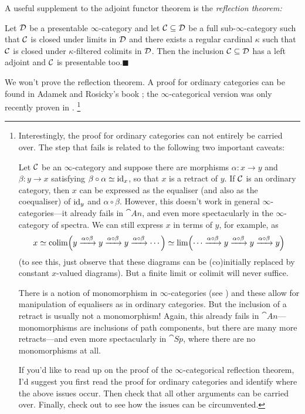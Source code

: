 A useful supplement to the adjoint functor theorem is the \emph{reflection theorem:}
\begin{thm}\label{thm:ReflectionTheorem}
	Let $\mathcal{D}$ be a presentable $\infty$-category and let $\mathcal{C}\subseteq\mathcal{D}$ be a full sub-$\infty$-category such that $\mathcal{C}$ is closed under limits in $\mathcal{D}$ and there exists a regular cardinal $\kappa$ such that $\mathcal{C}$ is closed under $\kappa$-filtered colimits in $\mathcal{D}$. Then the inclusion $\mathcal{C}\subseteq \mathcal{D}$ has a left adjoint and $\mathcal{C}$ is presentable too.\hfill$\blacksquare$
\end{thm}
We won't prove the reflection theorem. A proof for ordinary categories can be found in Adamek and Rosicky's book \cite[Reflection Theorem~2.48]{AdamekRosicky}; the $\infty$-categorical version was only recently proven in \cite{ReflectionTheorem}.%
\footnote{\label{footnote:ReflectionTheorem}Interestingly, the proof for ordinary categories can not entirely be carried over. The step that fails is related to the following two important caveats:
\begin{alphanumerate}
	\item Let $\mathcal{C}$ be an $\infty$-category and suppose there are morphisms $\alpha\colon x\rightarrow y$ and $\beta\colon y\rightarrow x$ satisfying $\beta\circ\alpha\simeq \operatorname{id}_x$, so that $x$ is a retract of $y$. If $\mathcal{C}$ is an ordinary category, then $x$ can be expressed as the equaliser (and also as the coequaliser) of $\operatorname{id}_y$ and $\alpha\circ\beta$. However, this doesn't work in general $\infty$-categories---it already fails in $\cat{An}$, and even more spectacularly in the $\infty$-category of spectra. We can still express $x$ in terms of $y$, for example, as\label{enum:Retracts}
	\begin{equation*}
		x\simeq \colimit\left(y\xrightarrow{\alpha\circ\beta}y\xrightarrow{\alpha\circ\beta}y\xrightarrow{\alpha\circ\beta}\dotsb\right)\simeq \limit\left(\dotsb\xrightarrow{\alpha\circ\beta}y\xrightarrow{\alpha\circ\beta}y\xrightarrow{\alpha\circ\beta}y\right)
	\end{equation*}
	(to see this, just observe that these diagrams can be (co)initially replaced by constant $x$-valued diagrams). But a finite limit or colimit will never suffice.
	\item There is a notion of monomorphism in $\infty$-categories (see \cite[\S\href{https://people.math.harvard.edu/~lurie/papers/HTT.pdf\#subsection.5.5.6}{5.5.6}]{HTT}) and these allow for manipulation of equalisers as in ordinary categories. But the inclusion of a retract is usually not a monomorphism! Again, this already fails in $\cat{An}$---monomorphisms are inclusions of path components, but there are many more retracts---and even more spectacularly in $\cat{Sp}$, where there are no monomorphisms at all.\label{enum:Monomorphisms}
\end{alphanumerate}
If you'd like to read up on the proof of the $\infty$-categorical reflection theorem, I'd suggest you first read the proof for ordinary categories and identify where the above issues occur. Then check that all other arguments can be carried over. Finally, check out \cite{ReflectionTheorem} to see how the issues can be circumvented.
}
